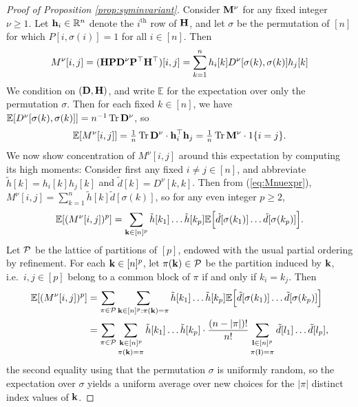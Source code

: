 \documentclass[10pt,reqno]{amsart}
\def\E{\mathbb{E}}
\def\R{\mathbb{R}}
\def\Tr{\operatorname{Tr}}
\begin{document}
\begin{proof}[Proof of Proposition \ref{prop:syminvariant}]
Consider $\mathbf{M}^\nu$ for any fixed integer $\nu \geq 1$.
Let $\bh_i \in \R^n$ denote the $i^\text{th}$ row of $\mathbf{H}$,
and let $\sigma$ be the permutation of $[n]$ for which $P[i,\sigma(i)]=1$ for
all $i \in [n]$. Then
\begin{equation}\label{eq:Mnuexpr}
M^\nu[i,j]=(\mathbf{H}\mathbf{P}\mathbf{D}^\nu \mathbf{P}^\top \mathbf{H}^\top)[i,j]
=\sum_{k=1}^n h_i[k]D^\nu[\sigma(k),\sigma(k)]h_j[k]
\end{equation}
We condition on $(\mathbf{D},\mathbf{H})$, and write $\E$ for the expectation over only the
permutation $\sigma$. Then for each fixed $k \in [n]$, we have
$\E[D^\nu[\sigma(k),\sigma(k)]]=n^{-1} \Tr \bD^\nu$, so
\[\E[M^\nu[i,j]]=\tfrac{1}{n}\Tr \bD^\nu \cdot \bh_i^\top \bh_j
=\tfrac{1}{n}\Tr \bM^\nu \cdot 1\{i=j\}.\]
We now show concentration of $M^\nu[i,j]$ around this expectation by
computing its high moments: Consider first any fixed $i \neq j \in [n]$,
and abbreviate $\tilde h[k]=h_i[k]h_j[k]$ and $\tilde d[k]=D^\nu[k,k]$. Then 
from (\ref{eq:Mnuexpr}), $M^\nu[i,j]=\sum_{k=1}^n \tilde h[k] \tilde d[\sigma(k)]$,
so for any even integer $p \geq 2$,
\[\E[(M^\nu[i,j])^p]=\sum_{\bk \in [n]^p}
\tilde h[k_1]\ldots \tilde h[k_p]
\E\Big[\tilde d[\sigma(k_1)]\ldots \tilde d[\sigma(k_p)]\Big].\]
Let $\mathcal{P}$ be the lattice of partitions of $[p]$, endowed with the usual partial
ordering by refinement. For each $\mathbf{k} \in [n]^p$, let
$\pi(\mathbf{k}) \in \mathcal{P}$ be the partition induced by $\mathbf{k}$,
i.e.\ $i,j \in [p]$ belong to a common block of $\pi$ if and only if $k_i=k_j$.
Then
\begin{align}
\E[(M^\nu[i,j])^p]&=\sum_{\pi \in \cP}
\sum_{\bk \in [n]^p:\pi(\bk)=\pi} 
\tilde h[k_1]\ldots \tilde h[k_p]
\E\Big[\tilde d[\sigma(k_1)]\ldots \tilde d[\sigma(k_p)]\Big]
\notag\\
&=\sum_{\pi \in \cP} \mathop{\sum_{\bk \in [n]^p}}_{\pi(\bk)=\pi} \tilde h[k_1]\ldots \tilde h[k_p]
\cdot \frac{(n-|\pi|)!}{n!} 
\mathop{\sum_{\bl \in [n]^p}}_{\pi(\bl)=\pi} \tilde d[l_1]\ldots \tilde d[l_p],\label{eq:EMijoff}
\end{align}
the second equality using that the permutation $\sigma$ is uniformly random, so
the expectation over $\sigma$ yields a uniform average over new choices for the
$|\pi|$ distinct index values of $\mathbf{k}$. 


\end{proof}
\end{document}
